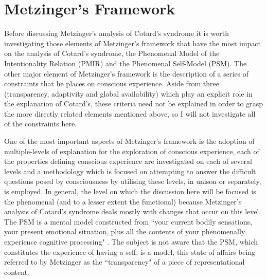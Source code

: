 \chapter{Metzinger's Framework}
\label{chap:framework}

Before discussing Metzinger's analysis of Cotard's syndrome it is worth investigating those elements of Metzinger's framework that have the most impact on the analysis of Cotard's syndrome, the Phenomenal Model of the Intentionality Relation (PMIR) and the Phenomenal Self-Model (PSM). The other major element of Metzinger's framework is the description of a series of constraints that he places on conscious experience. Aside from three (transparency, adaptivity and global availability) which play an explicit role in the explanation of Cotard's, these criteria need not be explained in order to grasp the more directly related elements mentioned above, so I will not investigate all of the constraints here.

One of the most important aspects of Metzinger's framework is the adoption of multiple-levels of explanation for the exploration of conscious experience, each of the properties defining conscious experience are investigated on each of several levels and a methodology which is focused on attempting to answer the difficult questions posed by consciousness by utilising these levels, in unison or separately, is employed. In general, the level on which the discussion here will be focused is the phenomenal (and to a lesser extent the functional) because Metzinger's analysis of Cotard's syndrome deals mostly with changes that occur on this level.
The PSM is a mental model constructed from ``your current bodily sensations, your present emotional situation, plus all the contents of your phenomenally experience cognitive processing" \cite[p. 299]{metzinger2003}. The subject is not aware that the PSM, which constitutes the experience of having a self, is a model, this state of affairs being referred to by Metzinger as the ``transparency" of a piece of representational content.

